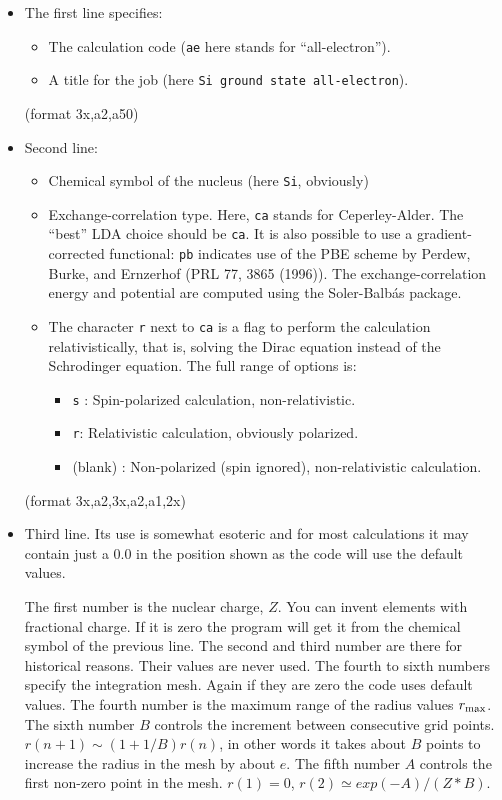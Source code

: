 \documentclass[11pt]{article}
\begin{document}
\begin{itemize}
\item The first line specifies:
	\begin{itemize}
	\item The calculation code ({\tt ae} here stands for ``all-electron'').
	\item A title for the job (here {\tt Si ground state all-electron}).
	\end{itemize}
	(format 3x,a2,a50)

\item Second line:
	\begin{itemize}

	\item Chemical symbol of the nucleus (here {\tt Si}, obviously)
	\item Exchange-correlation type. Here, {\tt ca} stands for
          Ceperley-Alder.  The
          ``best'' LDA choice should be {\tt ca}.  It is also possible
          to use a gradient-corrected functional: {\tt pb} indicates use
          of the PBE scheme by Perdew, Burke, and Ernzerhof (PRL 77,
          3865 (1996)).
	  The exchange-correlation energy and potential
	  are computed using the Soler-Balb\'as package.

	\item The character {\tt r} next to {\tt ca} is a flag to perform the
          calculation relativistically, that is, solving the Dirac equation
          instead of the Schrodinger equation.
	  The full range of options is:
	    \begin{itemize}
		\item {\tt s} : Spin-polarized calculation, non-relativistic.
		\item {\tt r}: Relativistic calculation, obviously polarized.
		\item (blank) : Non-polarized (spin ignored), non-relativistic
           		calculation.
	    \end{itemize}
	\end{itemize}

	(format 3x,a2,3x,a2,a1,2x)

\item Third line. Its use is somewhat esoteric and for most
calculations it may contain just a 0.0 in the
position shown as the code will use the default values.

The first number is the nuclear charge, $Z$.  You can invent elements with fractional charge.
If it is zero the program will get it from the chemical symbol of the previous line.
The second and third number are there for historical reasons.  Their values are
never used.  The fourth to sixth numbers specify the integration mesh.
Again if they are zero the code uses default values.
The fourth number is the maximum range of the radius values $r_{\rm max}$.
The sixth number $B$ controls the increment between consecutive grid points.
$r(n+1) \sim (1+1/B) r(n)$, in other words it takes about $B$ points to increase the
radius in the mesh by about $e$.  The fifth number $A$ controls the first non-zero
point in the mesh. $r(1) = 0$, $r(2) \simeq exp(-A)/(Z*B)$.


\end{itemize}
\end{document}
